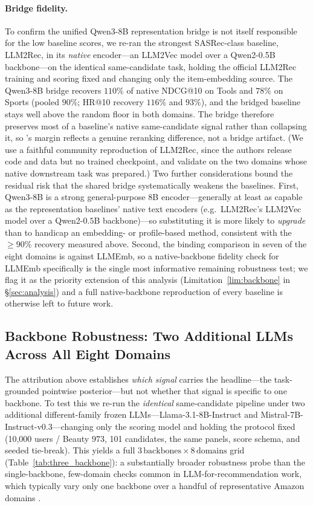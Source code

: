 \paragraph{Bridge fidelity.} To confirm the unified Qwen3-8B representation
bridge is not itself responsible for the low baseline scores, we re-ran the
strongest SASRec-class baseline, LLM2Rec, in its \emph{native} encoder---an
LLM2Vec model over a Qwen2-0.5B backbone---on the identical same-candidate task,
holding the official LLM2Rec training and scoring fixed and changing only the
item-embedding source. The Qwen3-8B bridge recovers $110\%$ of native NDCG@10 on
Tools and $78\%$ on Sports (pooled $90\%$; HR@10 recovery $116\%$ and $93\%$),
and the bridged baseline stays well above the random floor in both domains. The
bridge therefore preserves most of a baseline's native same-candidate signal
rather than collapsing it, so \method{}'s margin reflects a genuine reranking
difference, not a bridge artifact. (We use a faithful community reproduction of
LLM2Rec, since the authors release code and data but no trained checkpoint, and
validate on the two domains whose native downstream task was prepared.) Two
further considerations bound the residual risk that the shared bridge
systematically weakens the baselines. First, Qwen3-8B is a strong general-purpose
$8$B encoder---generally at least as capable as the representation baselines'
native text encoders (e.g.\ LLM2Rec's LLM2Vec model over a Qwen2-$0.5$B
backbone)---so substituting it is more likely to \emph{upgrade} than to handicap
an embedding- or profile-based method, consistent with the $\ge\!90\%$ recovery
measured above. Second, the binding comparison in seven of the eight domains is
against LLMEmb, so a native-backbone fidelity check for LLMEmb specifically is the
single most informative remaining robustness test; we flag it as the priority
extension of this analysis (Limitation~\ref{lim:backbone} in \S\ref{sec:analysis})
and a full native-backbone reproduction of every baseline is otherwise left to
future work.

\subsection{Backbone Robustness: Two Additional LLMs Across All Eight Domains}
\label{sec:second_backbone}

The attribution above establishes \emph{which signal} carries the headline---the
task-grounded pointwise posterior---but not whether that signal is specific to
one backbone. To test this we re-run the \emph{identical} same-candidate pipeline
under two additional different-family frozen LLMs---Llama-3.1-8B-Instruct and
Mistral-7B-Instruct-v0.3---changing only the scoring model and holding the
protocol fixed (10{,}000 users / Beauty $973$, 101 candidates, the same panels,
score schema, and seeded tie-break). This yields a full
$3\,\text{backbones}\times 8\,\text{domains}$ grid
(Table~\ref{tab:three_backbone}): a substantially broader robustness probe than
the single-backbone, few-domain checks common in LLM-for-recommendation work,
which typically vary only one backbone over a handful of representative Amazon
domains \citep{xu2025slmrec}.


